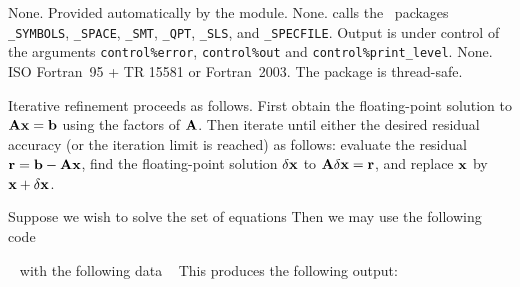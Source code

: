 \documentclass{galahad}
\newcommand{\packagename}{IR}
\begin{document}

\galgeneral

\galcommon None.
\galworkspace Provided automatically by the module.
\galroutines None.
\galmodules {\tt \packagename\_solve} calls the \galahad\ packages
{\tt \libraryname\_SY\-M\-BOLS},
{\tt \libraryname\_\-SPACE},
{\tt \libraryname\_\-SMT},
{\tt \libraryname\_\-QPT},
{\tt \libraryname\_SLS},
and
{\tt \libraryname\_SPECFILE}.
\galio Output is under control of the arguments
{\tt control\%error}, {\tt control\%out} and {\tt control\%print\_level}.
\galrestrictions None.
\galportability ISO Fortran~95 + TR 15581 or Fortran~2003.
The package is thread-safe.


\galmethod
Iterative refinement proceeds as follows. First obtain the floating-point
solution to ${\mathbf{A}} {\mathbf{x}} = {\mathbf{b}}$ using the factors of ${\mathbf{A}}$. Then iterate
until either the desired residual accuracy (or the iteration limit is
reached) as follows: evaluate the residual ${\mathbf{r}} = {\mathbf{b}} - {\mathbf{A}} {\mathbf{x}}$,
find the floating-point solution $\delta {\mathbf{x}}$ to ${\mathbf{A}} \delta {\mathbf{x}} = {\mathbf{r}}$,
and replace ${\mathbf{x}}$ by ${\mathbf{x}} + \delta {\mathbf{x}}$.


\galexample
Suppose we wish to solve the set of equations
Then we may use the following code

{\tt \small
\VerbatimInput{\packageexample}
}
\noindent
with the following data
{\tt \small
\VerbatimInput{\packagedata}
}
\noindent
This produces the following output:
{\tt \small
\VerbatimInput{\packageresults}
}
\end{document}

